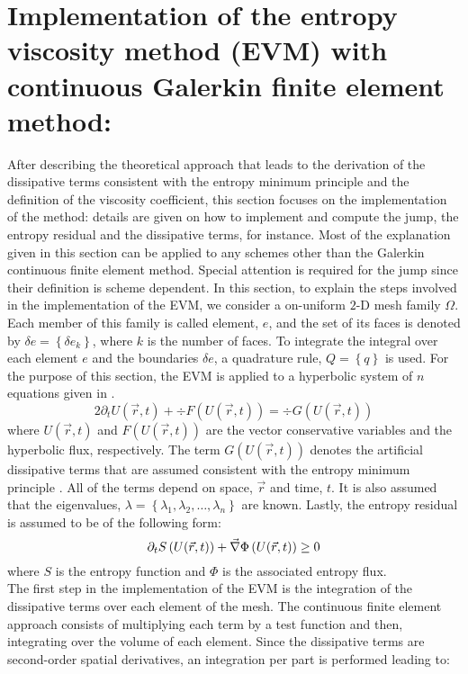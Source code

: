 \section{Implementation of the entropy viscosity method (EVM) with continuous Galerkin finite element method:}
After describing the theoretical approach that leads to the derivation of the dissipative terms consistent with the entropy minimum principle and the definition of the viscosity coefficient, this section focuses on the implementation of the method: details are given on how to implement and compute the jump, the entropy residual and the dissipative terms, for instance. Most of the explanation given in this section can be applied to any schemes other than the Galerkin continuous finite element method. Special attention is required for the jump since their definition is scheme dependent. In this section, to explain the steps involved in the implementation of the EVM, we consider a on-uniform $2$-D mesh family $\Omega$. Each member of this family is called element, $e$, and the set of its faces is denoted by $\delta e = \left\{ \delta e_k \right\}$, where $k$ is the number of faces. To integrate the integral over each element $e$ and the boundaries $\delta e$, a quadrature rule, $Q = \left\{ q \right\}$ is used. For the purpose of this section, the EVM is applied to a hyperbolic system of $n$ equations given in . 
\begin{equation}\label{eq:system}2
\partial_t U(\vec{r},t) + \div F(U(\vec{r},t)) = \div G(U(\vec{r},t))
\end{equation}
where $U(\vec{r},t)$ and $F(U(\vec{r},t))$ are the vector conservative variables and the hyperbolic flux, respectively. The term $G(U(\vec{r},t))$ denotes the artificial dissipative terms that are assumed consistent with the entropy minimum principle \cite{jlg3}. All of the terms depend on space, $\vec{r}$ and time, $t$. It is also assumed that the eigenvalues, $\lambda = \left\{ \lambda_1, \lambda_2, \dots, \lambda_n \right\}$ are known. Lastly, the entropy residual is assumed to be of the following form:
\begin{equation}\label{eq:ent_residual_ex}
\partial_t S \left( U(\vec{r},t) \right) +  \vec{\nabla} \Phi \left( U(\vec{r},t) \right) \geq 0
\end{equation}
where $S$ is the entropy function and $\Phi$ is the associated entropy flux. \\ 
The first step in the implementation of the EVM is the integration of the dissipative terms over each element of the mesh. The continuous finite element approach consists of multiplying each term by a test function and then, integrating over the volume of each element. Since the dissipative terms are second-order spatial derivatives, an integration per part is performed leading to:
